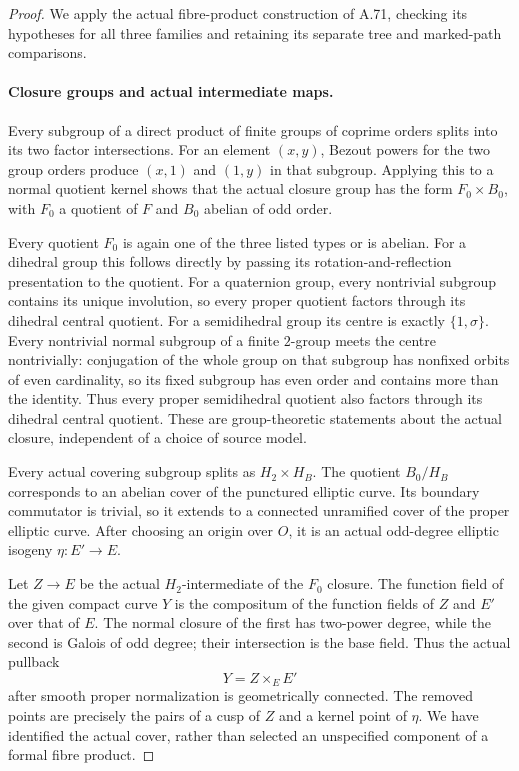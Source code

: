 \begin{proof}
We apply the actual fibre-product construction of A.71,
checking its hypotheses for all three families and retaining
its separate tree and marked-path comparisons.

\paragraph{Closure groups and actual intermediate maps.}
Every subgroup of a direct product of finite groups of coprime
orders splits into its two factor intersections. For an element
\((x,y)\), Bezout powers for the two group orders produce
\((x,1)\) and \((1,y)\) in that subgroup. Applying this to
a normal quotient kernel shows that the actual closure group
has the form \(F_0\times B_0\), with \(F_0\) a quotient
of \(F\) and \(B_0\) abelian of odd order.

Every quotient \(F_0\) is again one of the three listed
types or is abelian. For a dihedral group this follows
directly by passing its rotation-and-reflection presentation
to the quotient. For a quaternion group, every nontrivial
subgroup contains its unique involution, so every proper
quotient factors through its dihedral central quotient.
For a semidihedral group its centre is exactly
\(\{1,\sigma\}\). Every nontrivial normal subgroup of a
finite \(2\)-group meets the centre nontrivially: conjugation
of the whole group on that subgroup has nonfixed orbits of
even cardinality, so its fixed subgroup has even order and
contains more than the identity. Thus every proper
semidihedral quotient also factors through its dihedral
central quotient. These are group-theoretic statements about
the actual closure, independent of a choice of source model.

Every actual covering subgroup splits as \(H_2\times H_B\).
The quotient \(B_0/H_B\) corresponds to an abelian cover of
the punctured elliptic curve. Its boundary commutator is
trivial, so it extends to a connected unramified cover of
the proper elliptic curve. After choosing an origin over
\(O\), it is an actual odd-degree elliptic isogeny
\(\eta:E'\to E\).

Let \(Z\to E\) be the actual \(H_2\)-intermediate of
the \(F_0\) closure. The function field of the given
compact curve \(Y\) is the compositum of the function
fields of \(Z\) and \(E'\) over that of \(E\). The
normal closure of the first has two-power degree, while
the second is Galois of odd degree; their intersection is
the base field. Thus the actual pullback
\[
                         Y=Z\times_E E'
\]
after smooth proper normalization is geometrically connected.
The removed points are precisely the pairs of a cusp of
\(Z\) and a kernel point of \(\eta\). We have identified
the actual cover, rather than selected an unspecified
component of a formal fibre product.


\end{proof}
